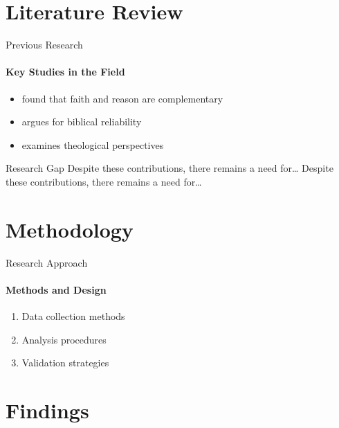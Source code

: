 \documentclass[
  12pt,
  aspectratio=169,  %
  t,                %
  ignorenonframetext %
]{beamer}
\begin{document}
\section{Literature Review}

\begin{frame}{Previous Research}
  \framesubtitle{Key Studies in the Field}

  \begin{itemize}
    \item \textcite{smith2020} found that faith and reason are complementary
    \item \textcite{mounce2021} argues for biblical reliability
    \item \textcite{doe2021} examines theological perspectives
  \end{itemize}

  \pause%

  \begin{block}{Research Gap}
  Despite these contributions, there remains a need for\ldots
    Despite these contributions, there remains a need for\ldots
  \end{block}

\end{frame}

\section{Methodology}

\begin{frame}{Research Approach}
  \framesubtitle{Methods and Design}

  \begin{enumerate}
    \item Data collection methods
    \item Analysis procedures
    \item Validation strategies
  \end{enumerate}

\end{frame}

\section{Findings}
\end{document}
